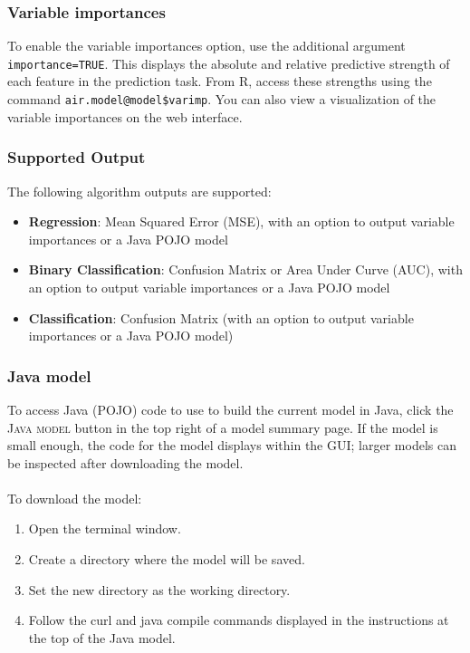 \documentclass[11pt]{article}
\begin{document}
{\subsubsection{Variable importances} 

To enable the variable importances option, use the additional argument \texttt{importance=TRUE}. This displays the absolute and relative predictive strength of each feature in the prediction task. From R, access these strengths using the command \texttt{air.model@model\$varimp}. You can also view a visualization of the variable
importances on the web interface.

\subsubsection{Supported Output}

The following algorithm outputs are supported: 
\begin{itemize}
\item {\bf{Regression}}: Mean Squared Error (MSE), with an option to output variable importances or a Java POJO model
\item {\bf{Binary Classification}}: Confusion Matrix or Area Under Curve (AUC), with an option to output variable importances or a Java POJO model
\item {\bf{Classification}}: Confusion Matrix (with an option to output variable importances or a Java POJO model)
\end{itemize}

\subsubsection{Java model}  

To access Java (POJO) code to use to build the current model in Java, click the \textsc{Java model} button in the top right of a model summary page. If the model is small enough, the code for the model displays within the GUI; larger models can be inspected after downloading the model.
\\
\\
To download the model: 
\begin{enumerate}
\item Open the terminal window.
\item Create a directory where the model will be saved.
\item Set the new directory as the working directory.
\item Follow the curl and java compile commands displayed in the instructions at the top of the Java model.
\end{enumerate}

}
\end{document}
